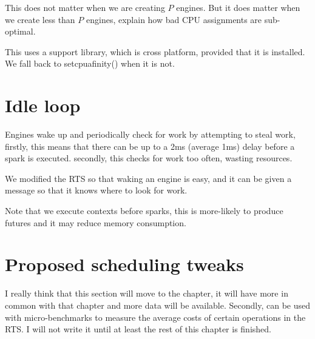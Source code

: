 This does not matter when we are creating $P$ engines.
But it does matter when we create less than $P$ engines,
explain how bad CPU assignments are sub-optimal.

This uses a support library, which is cross platform, provided that it is installed.
We fall back to setcpuafinity() when it is not.


\section{Idle loop}
\label{sec:idle_loop}

Engines wake up and periodically check for work by attempting to
steal work,
firstly, this means that there can be up to a 2ms (average 1ms) delay before
a spark is executed.
secondly, this checks for work too often, wasting resources.

We modified the RTS so that waking an engine is easy, and it can be given a
message so that it knows where to look for work.




Note that we execute contexts before sparks,
this is more-likely to produce futures and it may reduce memory consumption.

\section{Proposed scheduling tweaks}
\label{sec:proposed_tweaks}

I really think that this section will move to the \tscope chapter,
it will have more in common with that chapter and more data will be
available.
Secondly, \tscope can be used with micro-benchmarks to measure the
average costs of certain operations in the RTS.
I will not write it until at least the rest of this chapter is finished.

